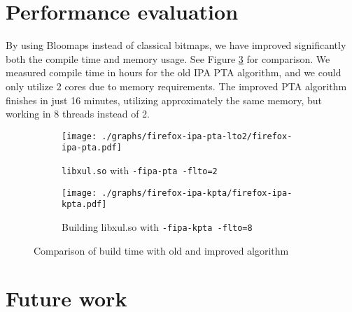 \section{Performance evaluation}

By using Bloomaps instead of classical bitmaps, we have improved significantly
both the compile time and memory usage. See Figure
\ref{figure-new-old-comparison} for comparison. We measured compile time in
hours for the old IPA PTA algorithm, and we could only utilize 2 cores due to
memory requirements. The improved PTA algorithm finishes in just 16 minutes,
utilizing approximately the same memory, but working in 8 threads instead of 2.

\begin{figure}[h!]
\begin{subfigure}[b]{\textwidth}
	\centering
	\texttt{[image: ./graphs/firefox-ipa-pta-lto2/firefox-ipa-pta.pdf]}
	\caption{{\tt libxul.so} with {\tt -fipa-pta -flto=2}}
	\label{figure-firefox-ipa-pta-lto2-2}
\end{subfigure}
\begin{subfigure}[b]{\textwidth}
	\centering
	\texttt{[image: ./graphs/firefox-ipa-kpta/firefox-ipa-kpta.pdf]}
	\caption{Building libxul.so with {\tt -fipa-kpta -flto=8}}
	\label{figure-firefox-ipa-kpta}
\end{subfigure}
\caption{Comparison of build time with old and improved algorithm}
	\label{figure-new-old-comparison}
\end{figure}




\section{Future work}
